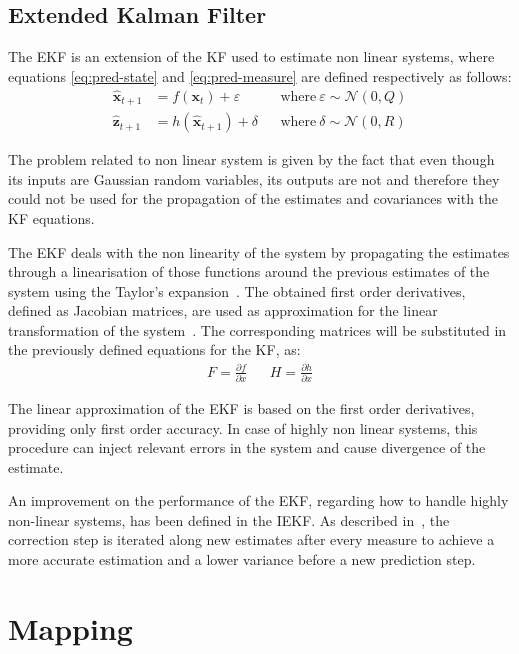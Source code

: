 \subsection{Extended Kalman Filter}

\noindent The \gls{EKF} is an extension of the \gls{KF} used to estimate non linear systems, where equations \eqref{eq:pred-state} and \eqref{eq:pred-measure} are defined respectively as follows:
\begin{align}
\hat{\mathbf{x}}_{t+1} & = f(\mathbf{x}_{t}) + \varepsilon &&
    \textrm{where}~\varepsilon \sim \mathcal{N}(0, Q)\\
\hat{\mathbf{z}}_{t+1} & = h(\hat{\mathbf{x}}_{t+1}) + \delta &&
    \textrm{where}~\delta \sim \mathcal{N}(0, R)
\end{align}

The problem related to non linear system is given by the fact that even though its inputs are Gaussian random variables, its outputs are not and therefore they could not be used for the propagation of the estimates and covariances with the \gls{KF} equations.

The \gls{EKF} deals with the non linearity of the system by propagating the estimates through a linearisation of those functions around the previous estimates of the system using the Taylor's expansion~\cite{thrun_probabilistic_2005}.
The obtained first order derivatives, defined as Jacobian matrices, are used as approximation for the linear transformation of the system~\cite{1386886}.
\newcommand{\partialat}[2]{\frac{\partial {#1}}{\partial {#2}}}
The corresponding matrices will be substituted in the previously defined equations for the \gls{KF}, as:
\begin{align}
F = \partialat{f}{x} & &
H = \partialat{h}{x}
\end{align}

The linear approximation of the \gls{EKF} is based on the first order derivatives, providing only first order accuracy. In case of highly non linear systems, this procedure can inject relevant errors in the system and cause divergence of the estimate.

An improvement on the performance of the \gls{EKF}, regarding how to handle highly non-linear systems, has been defined in the \gls{IEKF}. As described in~\cite{xu_adaptive_2014}, the correction step is iterated along new estimates after every measure to achieve a more accurate estimation and a lower variance before a new prediction step.


\section{Mapping}

